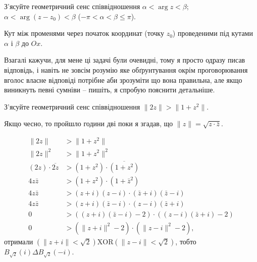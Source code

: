\begin{problem}[Волковиський, 1.29]
    З'ясуйте геометричний сенс співвідношення $\alpha < \arg z < \beta$; $\alpha < \arg (z - z_0) < \beta$ ($-\pi < \alpha < \beta \le \pi$).
\end{problem}

\begin{solution}
    Кут між променями через початок координат (точку $z_0$) проведеними під кутами $\alpha$ і $\beta$ до $Ox$.
\end{solution}

\begin{side_comment}
    Взагалі кажучи, для мене ці задачі були очевидні, тому я просто одразу писав відповідь, і навіть не зовсім розумію яке обґрунтування окрім проговорювання вголос власне відповіді потрібне аби зрозуміти що вона правильна, але якщо виникнуть певні сумніви -- пишіть, я спробую пояснити детальніше.
\end{side_comment}

\begin{problem}[Волковиський, 1.33]
    З'ясуйте геометричний сенс співвідношення $\|2z\| > \|1 + z^2\|$.
\end{problem}

\begin{side_comment}
    Якщо чесно, то пройшло години дві поки я згадав, що $\|z\|=\sqrt{z\cdot \bar z}$.
\end{side_comment}

\begin{solution}
    \begin{equation*}
        \begin{aligned}
            \|2z\| &> \|1 + z^2\| \\
            \|2z\|^2 &> \|1 + z^2\|^2 \\
            (2z) \cdot \overline{2z} &> (1+z^2) \cdot \overline{(1+z^2)} \\
            4 z \bar z &> (1 + z^2) \cdot (1 + \bar z^2) \\
            4 z \bar z &> (z + i) (z - i) \cdot (\bar z + i) (\bar z - i) \\
            4 z \bar z &> (z + i) (\bar z - i) \cdot (z - i) (\bar z + i) \\
            0 &> ((z + i) (\bar z - i) - 2) \cdot ((z - i) (\bar z + i) - 2) \\
            0 &> (\|z + i\|^2 - 2) \cdot (\|z - i\|^2 - 2),
        \end{aligned}
    \end{equation*}
    отримали $\left(\|z + i\| < \sqrt2\right) \text{XOR} \left(\|z - i\| < \sqrt2\right)$, тобто $B_{\sqrt 2}(i) \Delta B_{\sqrt 2}(-i)$.
\end{solution}
